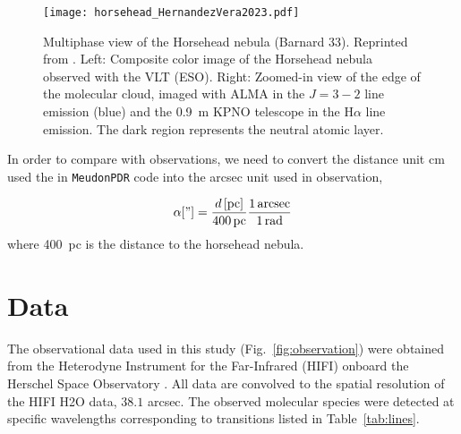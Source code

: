 \documentclass[12pt,a4paper]{article}
\newcommand{\mdpdr}{\texttt{MeudonPDR} code}
\begin{document}

\begin{figure}
    \centering
    \texttt{[image: horsehead\_HernandezVera2023.pdf]}
    \caption{Multiphase view of the Horsehead nebula (Barnard 33). Reprinted from \textcite{HernándezVera2023}. Left: Composite color image of the Horsehead nebula observed with the VLT (ESO). Right: Zoomed-in view of the edge of the molecular cloud, imaged with ALMA in the  $J = 3-2$ line emission (blue) and the \qty{0.9}{m} KPNO telescope in the H$\alpha$ line emission. The dark region represents the neutral atomic layer.} \label{fig:obsimg}
\end{figure}

In order to compare with observations, we need to convert the distance unit \unit{cm} used the in \mdpdr{} into the \unit{arcsec} unit used in observation,

\begin{equation}
    \alpha["] = \frac{d\,[\unit{pc}]}{400\,\unit{pc}} \frac{1\,\unit{arcsec}}{1\,\unit{rad}}\textbf{}
\end{equation}
where \qty{400}{pc} \parencite{Menten2007, Schlafly2014} is the distance to the horsehead nebula.

\section{Data}
The observational data used in this study (Fig.~\ref{fig:observation}) were obtained from the Heterodyne Instrument for the Far-Infrared (HIFI) \parencite{deGraauw2010} onboard the Herschel Space Observatory \parencite{Pilbratt2010}. All data are convolved to the spatial resolution of the HIFI H2O data, $38.1$ arcsec. The observed molecular species were detected at specific wavelengths corresponding to transitions listed in Table~\ref{tab:lines}. 
\end{document}
